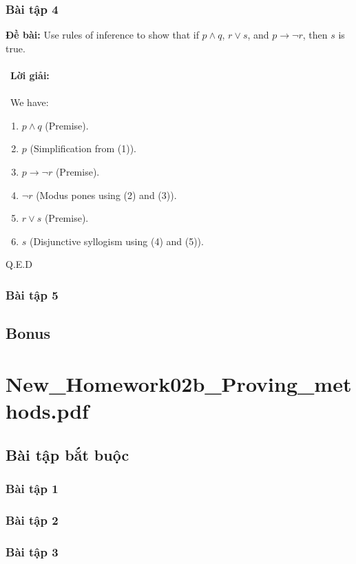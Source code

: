 \documentclass[a4paper]{article}
\begin{document}
\subsubsection{Bài tập 4}
\textbf{Đề bài:} Use rules of inference to show that if $p \land q$, $r \lor s$, and $p \rightarrow \lnot r$, then $s$ is true. \\\ \\\
\textbf{Lời giải:} \\\ \\\
We have:
\begin{enumerate}
\item $p \land q$ (Premise).
\item $p$ (Simplification from (1)).
\item $p \rightarrow \lnot r$ (Premise).
\item $\lnot r$ (Modus pones using (2) and (3)).
\item $r \lor s$ (Premise).
\item $s$ (Disjunctive syllogism using (4) and (5)).
\end{enumerate}
Q.E.D

\clearpage
\subsubsection{Bài tập 5}

\clearpage

\subsection{Bonus}
\clearpage

\section{New\_Homework02b\_Proving\_methods.pdf}
\subsection{Bài tập bắt buộc}
\subsubsection{Bài tập 1}

\clearpage
\subsubsection{Bài tập 2}

\clearpage
\subsubsection{Bài tập 3}
\end{document}
